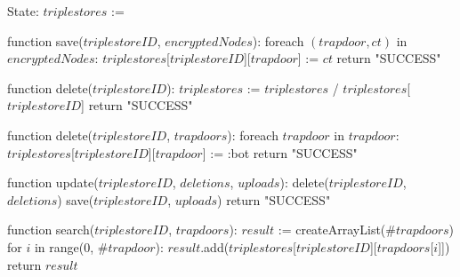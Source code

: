 State:
    $triplestores$ := {}
    
function save($triplestoreID$, $encryptedNodes$):
    foreach $(trapdoor, ct)$ in $encryptedNodes$:
        $triplestores$[$triplestoreID$][$trapdoor$] := $ct$
    return "SUCCESS"

function delete($triplestoreID$):
    $triplestores$ := $triplestores$ / { $triplestores$[$triplestoreID$] }
    return "SUCCESS"

function delete($triplestoreID$, $trapdoors$):
    foreach $trapdoor$ in $trapdoor$:
        $triplestores$[$triplestoreID$][$trapdoor$] := :bot
    return "SUCCESS"

function update($triplestoreID$, $deletions$, $uploads$):
    delete($triplestoreID$, $deletions$)
    save($triplestoreID$, $uploads$)
    return "SUCCESS"

function search($triplestoreID$, $trapdoors$):
    $result$ := createArrayList($\#trapdoors$)
    for $i$ in range(0, $\#trapdoor$):
        $result$.add($triplestores$[$triplestoreID$][$trapdoors$[$i$]])
    return $result$